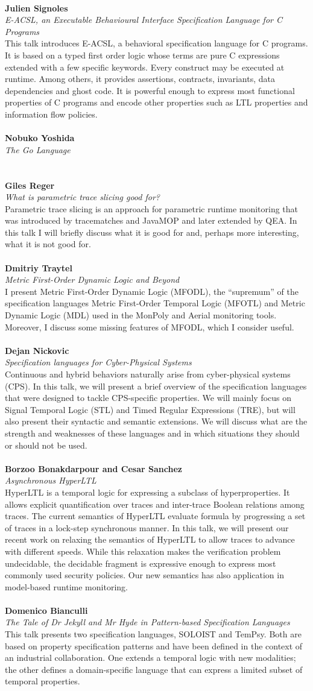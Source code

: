 \documentclass{article}
\newcounter{talkc}
\newcommand{\talk}[3]{\stepcounter{talkc}
\vspace{0.5em}~\\
\noindent
\textbf{#1}\\ 
\noindent\emph{#2}\\ 
\noindent#3\\
}
\begin{document}
\talk{Julien Signoles}{E-ACSL, an Executable Behavioural Interface Specification Language for C Programs}{This talk introduces E-ACSL, a behavioral specification language for C programs. It is based on a typed first order logic whose terms are pure C expressions extended with a few specific keywords. Every construct may be executed at runtime. Among others, it provides assertions, contracts, invariants, data dependencies and ghost code. It is powerful enough to express most functional properties of C programs and encode other properties such as LTL properties and information flow policies.}
%
\talk{Nobuko Yoshida}{The Go Language}{}
%
\talk{Giles Reger}{What is parametric trace slicing good for?}{Parametric trace slicing is an approach for parametric runtime monitoring that was introduced by tracematches and JavaMOP and later extended by QEA. In this talk I will briefly discuss what it is good for and, perhaps more interesting, what it is not good for.}
%
\talk{Dmitriy Traytel}{Metric First-Order Dynamic Logic and Beyond}{I present Metric First-Order Dynamic Logic (MFODL), the ``supremum'' of the specification languages Metric First-Order Temporal Logic (MFOTL) and Metric Dynamic Logic (MDL) used in the {\sc MonPoly} and {\sc Aerial} monitoring tools. Moreover, I discuss some missing features of MFODL, which I consider useful.}
%
\talk{Dejan Nickovic}{ Specification languages for Cyber-Physical Systems}{Continuous and hybrid behaviors naturally arise from cyber-physical systems (CPS). In this talk, we will present a brief overview of the specification languages that were designed to tackle CPS-specific properties. We will mainly focus on Signal Temporal Logic (STL) and Timed Regular Expressions (TRE), but will also present their syntactic and semantic extensions. We will discuss what are the strength and weaknesses of these languages and in which situations they should or should not be used.}
%
%
\talk{Borzoo Bonakdarpour and Cesar Sanchez}{Asynchronous HyperLTL}{HyperLTL is a temporal logic for expressing a subclass of hyperproperties. It allows explicit quantification over traces and inter-trace Boolean relations among traces. The current semantics of HyperLTL evaluate formula by progressing a set of traces in a lock-step synchronous manner. In this talk, we will present our recent work on relaxing the semantics of HyperLTL to allow traces to advance with different speeds. While this relaxation makes the verification problem undecidable, the decidable fragment is expressive enough to express most commonly used security policies. Our new semantics has also application in model-based runtime monitoring.}
%
\talk{Domenico Bianculli}{The Tale of Dr Jekyll and Mr Hyde in Pattern-based Specification Languages}{This talk presents two specification languages, SOLOIST and TemPsy. Both are based on property specification patterns and have been defined in the context of an industrial collaboration. One extends a temporal logic with new modalities; the other defines a domain-specific language  that can express a limited subset of temporal properties.}
\end{document}
